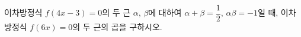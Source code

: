 이차방정식 $f(4x-3)=0$의 두 근 $\alpha$, $\beta$에 대하여 $\alpha+\beta=\dfrac{1}{2}$, $\alpha\beta=-1$일 때, 이차방정식 $f(6x)=0$의 두 근의 곱을 구하시오.
